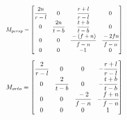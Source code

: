 	\begin{equation} \label{eq-persp}
		\resizebox{.35\hsize}{!}{$ M_{persp}
		=
		\begin{bmatrix}
			\cfrac{2n}{r-l} & 0 & \cfrac{r+l}{r-l} & 0 \\
			0 & \cfrac{2n}{t-b} & \cfrac{t+b}{t-b} & 0 \\
			0 & 0 & \cfrac{-(f+n)}{f-n} & \cfrac{-2fn}{f-n}\\
			0 & 0 & -1 & 0 \\
		\end{bmatrix} $}
	\end{equation}
	\begin{equation} \label{eq-ortho}
		\resizebox{.35\hsize}{!}{$ M_{orto}
		=
		\begin{bmatrix}
			\cfrac{2}{r-l} & 0 & 0 & -\cfrac{r+l}{r-l} \\
			0 & \cfrac{2}{t-b} & 0 & -\cfrac{t+b}{t-b} \\
			0 & 0 & \cfrac{-2}{f-n} & -\cfrac{f+n}{f-n}\\
			0 & 0 & 0 & 1 \\
		\end{bmatrix} $}
	\end{equation}

